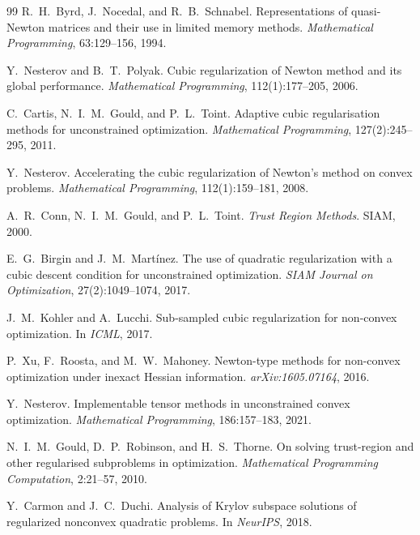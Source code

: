 \documentclass[11pt,a4paper]{article}
\begin{document}
\begin{thebibliography}{99}
R.~H.~Byrd, J.~Nocedal, and R.~B.~Schnabel.
Representations of quasi-Newton matrices and their use in limited memory methods.
\textit{Mathematical Programming}, 63:129--156, 1994.

Y.~Nesterov and B.~T.~Polyak.
Cubic regularization of Newton method and its global performance.
\textit{Mathematical Programming}, 112(1):177--205, 2006.

C.~Cartis, N.~I.~M.~Gould, and P.~L.~Toint.
Adaptive cubic regularisation methods for unconstrained optimization.
\textit{Mathematical Programming}, 127(2):245--295, 2011.

Y.~Nesterov.
Accelerating the cubic regularization of Newton's method on convex problems.
\textit{Mathematical Programming}, 112(1):159--181, 2008.

A.~R.~Conn, N.~I.~M.~Gould, and P.~L.~Toint.
\textit{Trust Region Methods}.
SIAM, 2000.

E.~G.~Birgin and J.~M.~Mart\'inez.
The use of quadratic regularization with a cubic descent condition for unconstrained optimization.
\textit{SIAM Journal on Optimization}, 27(2):1049--1074, 2017.

J.~M.~Kohler and A.~Lucchi.
Sub-sampled cubic regularization for non-convex optimization.
In \textit{ICML}, 2017.

P.~Xu, F.~Roosta, and M.~W.~Mahoney.
Newton-type methods for non-convex optimization under inexact Hessian information.
\textit{arXiv:1605.07164}, 2016.

Y.~Nesterov.
Implementable tensor methods in unconstrained convex optimization.
\textit{Mathematical Programming}, 186:157--183, 2021.

N.~I.~M.~Gould, D.~P.~Robinson, and H.~S.~Thorne.
On solving trust-region and other regularised subproblems in optimization.
\textit{Mathematical Programming Computation}, 2:21--57, 2010.

Y.~Carmon and J.~C.~Duchi.
Analysis of Krylov subspace solutions of regularized nonconvex quadratic problems.
In \textit{NeurIPS}, 2018.
\end{thebibliography}
\end{document}
